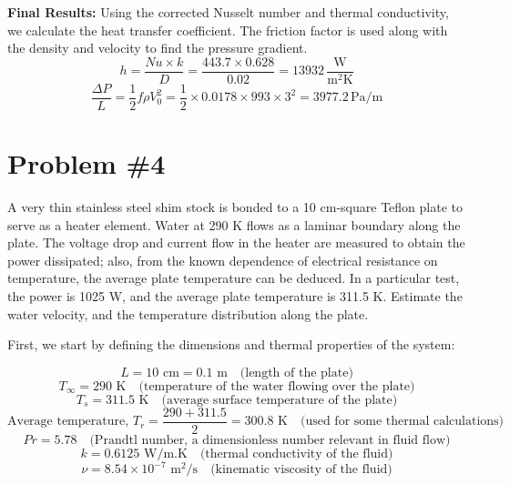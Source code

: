 \documentclass{article}
\numberwithin{equation}{section}
\begin{document}
\textbf{Final Results:}
Using the corrected Nusselt number and thermal conductivity, we calculate the heat transfer coefficient. The friction factor is used along with the density and velocity to find the pressure gradient.
\begin{equation}
h = \frac{Nu \times k}{D} = \frac{443.7 \times 0.628}{0.02} = 13932\, \frac{\text{W}}{\text{m}^2 \text{K}}
\end{equation}
\begin{equation}
\frac{\Delta P}{L} = \frac{1}{2} f \rho V_0^2 = \frac{1}{2} \times 0.0178 \times 993 \times 3^2 = 3977.2\, \text{Pa/m}
\end{equation}


\newpage
\section{Problem \#4} 
A very thin stainless steel shim stock is bonded to a 10 cm-square Teflon plate to serve as a heater element. Water at 290 K flows as a laminar boundary along the plate. The voltage drop and current flow in the heater are measured to obtain the power dissipated; also, from the known dependence of electrical resistance on temperature, the average plate temperature can be deduced. In a particular test, the power is 1025 W, and the average plate temperature is 311.5 K. Estimate the water velocity, and the temperature distribution along the plate.

\noindent
First, we start by defining the dimensions and thermal properties of the system:

\begin{equation}
L = 10 \text{ cm} = 0.1 \text{ m} \quad \text{(length of the plate)}
\end{equation}
\begin{equation}
T_{\infty} = 290 \text{ K} \quad \text{(temperature of the water flowing over the plate)}
\end{equation}
\begin{equation}
T_{s} = 311.5 \text{ K} \quad \text{(average surface temperature of the plate)}
\end{equation}
\begin{equation}
\text{Average temperature, } T_{r} = \frac{290 + 311.5}{2} = 300.8 \text{ K} \quad \text{(used for some thermal calculations)}
\end{equation}
\begin{equation}
Pr = 5.78 \quad \text{(Prandtl number, a dimensionless number relevant in fluid flow)}
\end{equation}
\begin{equation}
k = 0.6125 \text{ W/m.K} \quad \text{(thermal conductivity of the fluid)}
\end{equation}
\begin{equation}
\nu = 8.54 \times 10^{-7} \text{ m}^2/\text{s} \quad \text{(kinematic viscosity of the fluid)}
\end{equation}
\end{document}
